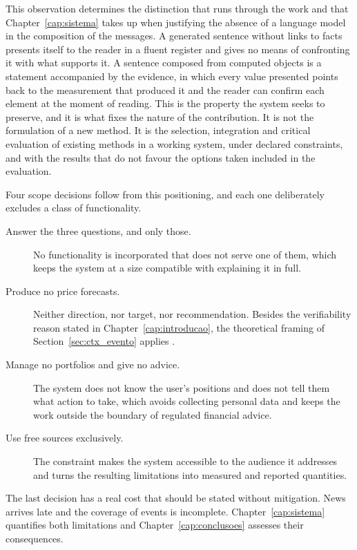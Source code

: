 This observation determines the distinction that runs through the work and that
Chapter~\ref{cap:sistema} takes up when justifying the absence of a language model in the
composition of the messages. A generated sentence without links to facts presents itself to the reader
in a fluent register and gives no means of confronting it with what supports it. A sentence
composed from computed objects is a statement accompanied by the evidence, in which every value
presented points back to the measurement that produced it and the reader can confirm each element
at the moment of reading. This is the property the system seeks to preserve, and it is what fixes
the nature of the contribution. It is not the formulation of a new method. It is the selection,
integration and critical evaluation of existing methods in a working system, under declared
constraints, and with the results that do not favour the options taken included in the evaluation.

Four scope decisions follow from this positioning, and each one deliberately excludes a class of
functionality.

\begin{description}
  \item[Answer the three questions, and only those.] No functionality is incorporated that does not
        serve one of them, which keeps the system at a size compatible with explaining it in full.
  \item[Produce no price forecasts.] Neither direction, nor target, nor recommendation. Besides the
        verifiability reason stated in Chapter~\ref{cap:introducao}, the theoretical framing of
        Section~\ref{sec:ctx_evento} applies \autocite{fama1970efficient}.
  \item[Manage no portfolios and give no advice.] The system does not know the user's positions and
        does not tell them what action to take, which avoids collecting personal data and keeps the
        work outside the boundary of regulated financial advice.
  \item[Use free sources exclusively.] The constraint makes the system accessible to the audience
        it addresses and turns the resulting limitations into measured and reported quantities.
\end{description}

The last decision has a real cost that should be stated without mitigation. News arrives late and
the coverage of events is incomplete. Chapter~\ref{cap:sistema} quantifies both limitations and
Chapter~\ref{cap:conclusoes} assesses their consequences.
